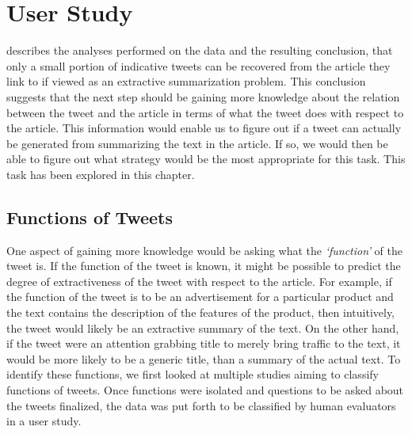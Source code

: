 \chapter{User Study}
\label{chap:user}

 describes the analyses performed on the data and the resulting conclusion, that only a small portion of indicative tweets can be recovered from the article they link to if viewed as an extractive summarization problem. This conclusion suggests that the next step should be gaining more knowledge about the relation between the tweet and the article in terms of what the tweet does with respect to the article. This information would enable us to figure out if a tweet can actually be generated from summarizing the text in the article. If so, we would then be able to figure out what strategy would be the most appropriate for this task. This task has been explored in this chapter. 

\section{Functions of Tweets}
One aspect of gaining more knowledge would be asking what the \textit{`function'} of the tweet is. If the function of the tweet is known, it might be possible to predict the degree of extractiveness of the tweet with respect to the article. For example, if the function of the tweet is to be an advertisement for a particular product and the text contains the description of the features of the product, then intuitively, the tweet would likely be an extractive summary of the text. On the other hand, if the tweet were an attention grabbing title to merely bring traffic to the text, it would be more likely to be a generic title, than a summary of the actual text. To identify these functions, we first looked at multiple studies aiming to classify functions of tweets. Once functions were isolated and questions to be asked about the tweets finalized, the data was put forth to be classified by human evaluators in a user study.

